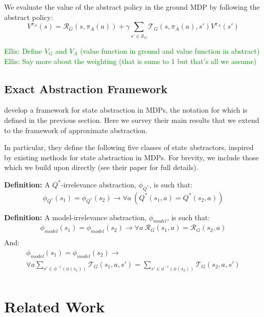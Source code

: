 \documentclass{article}
\newcommand\defn[1]{{\bf Definition:} #1}
\newcommand\enote[1]{\textcolor{green}{Ellis: #1}}
\begin{document}
We evaluate the value of the abstract policy in the ground MDP by following the abstract policy:
\begin{equation}
V^{\pi_A}(s) = \mathcal{R}_G(s,\pi_A(a)) + \gamma \sum_{s' \in \mathcal{S}_G} \mathcal{T}_G(s,\pi_A(a),s')V^{\pi_A}(s')
\end{equation}

\enote{Define $V_G$ and $V_A$ (value function in ground and value function in abstract)}
\enote{Say more about the weighting (that is sums to 1 but that's all we assume)}

\subsection{Exact Abstraction Framework}

\citep{li2006towards} develop a framework for state abstraction in \acp{MDP}, the notation for which is defined in the previous section. Here we survey their main results that we extend to the framework of approximate abstraction.

In particular, they define the following five classes of state abstractors, inspired by existing methods for state abstraction in \acp{MDP}. For brevity, we include those which we build upon directly (see their paper for full details).

\defn{A $Q^*$-irrelevance abstraction, $\phi_{Q^*}$, is such that:
\begin{equation}
\phi_{Q^*}(s_1) = \phi_{Q^*}(s_2) \longrightarrow \forall a\ \left(Q^*(s_1,a) = Q^*(s_2,a)\right)
\end{equation}
}

\defn{A model-irrelevance abstraction, $\phi_{model}$, is such that:
\begin{multline}
\phi_{model}(s_1) = \phi_{model}(s_2) \rightarrow \forall a\ \mathcal{R}_G(s_1,a) = \mathcal{R}_G(s_2,a) \\
\end{multline}
And:
\begin{multline}
\phi_{model}(s_1) = \phi_{model}(s_2) \rightarrow \\ \forall a \sum_{s' \in \phi^{-1}(\phi(s_1))} \mathcal{T}_G(s_1,a,s') =\sum_{s' \in \phi^{-1}(\phi(s_2))} \mathcal{T}_G(s_2,a,s') \\
\end{multline}
}


\section{Related Work}
\end{document}
